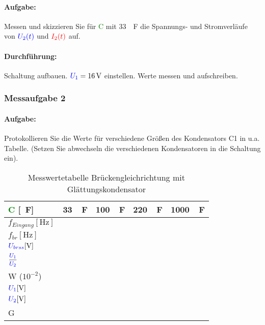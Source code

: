 \documentclass[11pt,a4paper,titlepage]{scrreprt}
\newcommand{\spannung}[1]{\textcolor{blue}{#1}}
\newcommand{\strom}[1]{\textcolor{red}{#1}}
\newcommand{\capacity}[1]{\textcolor{green}{#1}}
\begin{document}
			\paragraph{Aufgabe:}   Messen und skizzieren Sie für \capacity{C} mit \SI{33}{\mu\farad} die Spannungs- und Stromverläufe von $\spannung{U_2(t)}$ und $\strom{I_2(t)}$ auf.
			\paragraph{Durchführung:}  Schaltung aufbauen. $\spannung{U_1} = \SI{16}{\volt}$ einstellen. Werte messen und aufschreiben.\\

			\subsubsection{Messaufgabe 2}
			\paragraph{Aufgabe:}  Protokollieren Sie die Werte für verschiedene Größen des Kondensators C1 in u.a. Tabelle. (Setzen Sie abwechseln die verschiedenen Kondensatoren in die Schaltung ein). 
            
    			\begin{table}[!hbtp]
    				\caption{Messwertetabelle Brückengleichrichtung mit Glättungskondensator}
    				\label{tbl:messergebnisse2.2}
    				\renewcommand{\arraystretch}{1.3}
                    \begin{center}
    				\begin{tabular}{l|c|c|c|c}
    					\capacity{C} [\si{\mu\farad}] & \SI{33}{\mu\farad} &\SI{100}{\mu\farad} &\SI{220}{\mu\farad} &\SI{1000}{\mu\farad}\\ \hline
    					$f_{Eingang} [\si{\hertz}]$  &  &  &  & \\
    					$f_{br} [\si{\hertz}]$ &  &  &  & \\
    					$\spannung{U_{brss}} [\si{\volt}]$ &  &  &  &   \\
    					$\mfrac{\spannung{U_1}}{\spannung{U_2}}$ &  &  &  & \\
    					W ($10^{-2}$) & &  &  &  \\
    					$\spannung{U_1} [\si{\volt}]$ &  &  &  & \\
                        $\spannung{U_2} [\si{\volt}]$ &  &  &  & \\
                        G &	 &  &  & 
    				\end{tabular}
                \end{center}
    			\end{table}
            
\end{document}
